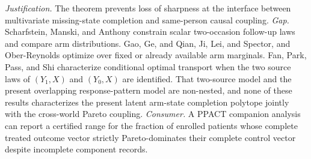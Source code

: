 \documentclass{article}
\begin{document}
\par\smallskip\noindent \textit{Justification.} The theorem prevents loss of sharpness at the interface between multivariate missing-state completion and same-person causal coupling. \textit{Gap.} Scharfstein, Manski, and Anthony constrain scalar two-occasion follow-up laws and compare arm distributions. Gao, Ge, and Qian, Ji, Lei, and Spector, and Ober-Reynolds optimize over fixed or already available arm marginals. Fan, Park, Pass, and Shi characterize conditional optimal transport when the two source laws of \((Y_1,X)\) and \((Y_0,X)\) are identified. That two-source model and the present overlapping response-pattern model are non-nested, and none of these results characterizes the present latent arm-state completion polytope jointly with the cross-world Pareto coupling. \textit{Consumer.} A PPACT companion analysis can report a certified range for the fraction of enrolled patients whose complete treated outcome vector strictly Pareto-dominates their complete control vector despite incomplete component records.
\end{document}
